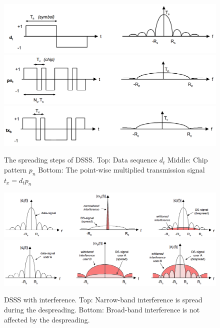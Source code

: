		\begin{figure}
			\includegraphics[width=\textwidth,keepaspectratio]{../presentation/imgs/dsss_ft_1.png}
			\includegraphics[width=\textwidth,keepaspectratio]{../presentation/imgs/dsss_ft_2.png}
			\includegraphics[width=\textwidth,keepaspectratio]{../presentation/imgs/dsss_ft_3.png}
			\caption{The spreading steps of DSSS.
					Top: Data sequence $d_t$
					Middle: Chip pattern $p_n$
					Bottom: The point-wise multiplied transmission signal $t_x = d_t p_n$
				}
			\label{dsss}
		\end{figure}
		\begin{figure}
			\includegraphics[width=\textwidth,keepaspectratio]{../presentation/imgs/dsss_inter_nar.png}
			\includegraphics[width=\textwidth,keepaspectratio]{../presentation/imgs/dsss_inter_broad.png}
			\caption{ DSSS with interference.
				Top: Narrow-band interference is spread during the despreading.
				Bottom: Broad-band interference is not affected by the despreading.
				}
			\label{dsss_interference}
		\end{figure}